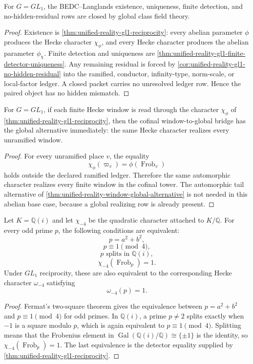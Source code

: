 \begin{theorem}
\label{thm:unified-reality-gl1-bedc-closure}
For $G=GL_1$, the BEDC--Langlands existence, uniqueness, finite
detection, and no-hidden-residual rows are closed by global class field
theory.
\end{theorem}
\begin{proof}
Existence is
\autoref{thm:unified-reality-gl1-reciprocity}: every abelian parameter
$\phi$ produces the Hecke character $\chi_{\phi}$, and every Hecke
character produces the abelian parameter $\phi_{\chi}$. Finite
detection and uniqueness are
\autoref{thm:unified-reality-gl1-finite-detector-uniqueness}. Any
remaining residual is forced by
\autoref{cor:unified-reality-gl1-no-hidden-residual} into the ramified,
conductor, infinity-type, norm-scale, or local-factor ledger. A closed
packet carries no unresolved ledger row. Hence the paired object has no
hidden mismatch.
\end{proof}

\begin{corollary}
\label{cor:unified-reality-gl1-cofinal-bridge}
For $G=GL_1$, if each finite Hecke window is read through the character
$\chi_{\phi}$ of
\autoref{thm:unified-reality-gl1-reciprocity}, then the cofinal
window-to-global bridge has the global alternative immediately: the same
Hecke character realizes every unramified window.
\end{corollary}
\begin{proof}
For every unramified place $v$, the equality
$$
\chi_{\phi}(\varpi_v)=\phi(\operatorname{Frob}_v)
$$
holds outside the declared ramified ledger. Therefore the same
automorphic character realizes every finite window in the cofinal tower.
The automorphic tail alternative of
\autoref{thm:unified-reality-window-global-alternative} is not needed in
this abelian base case, because a global realizing row is already
present.
\end{proof}

\begin{theorem}
\label{thm:unified-reality-gl1-quadratic-splitting-detector}
Let $K=\mathbb Q(i)$ and let $\chi_{-4}$ be the quadratic character
attached to $K/\mathbb Q$. For every odd prime $p$, the following
conditions are equivalent:
$$
p=a^2+b^2,
$$
$$
p\equiv 1\pmod 4,
$$
$$
p\text{ splits in }\mathbb Q(i),
$$
$$
\chi_{-4}(\operatorname{Frob}_p)=1.
$$
Under $GL_1$ reciprocity, these are also equivalent to the corresponding
Hecke character $\omega_{-4}$ satisfying
$$
\omega_{-4}(p)=1.
$$
\end{theorem}
\begin{proof}
Fermat's two-square theorem gives the equivalence between
$p=a^2+b^2$ and $p\equiv 1\pmod 4$ for odd primes. In
$\mathbb Q(i)$, a prime $p\ne2$ splits exactly when $-1$ is a square
modulo $p$, which is again equivalent to $p\equiv 1\pmod 4$. Splitting
means that the Frobenius element in
$\operatorname{Gal}(\mathbb Q(i)/\mathbb Q)\cong\{\pm1\}$ is the
identity, so $\chi_{-4}(\operatorname{Frob}_p)=1$. The last equivalence
is the detector equality supplied by
\autoref{thm:unified-reality-gl1-reciprocity}.
\end{proof}

